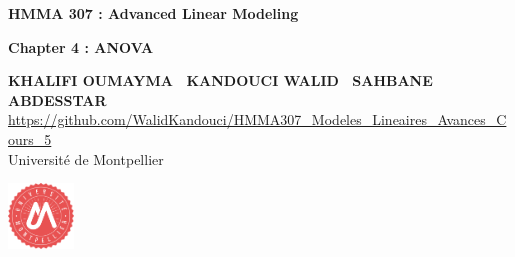 \documentclass[unknownkeysallowed]{beamer}
\begin{document}



\begin{frame}[noframenumbering]
\thispagestyle{empty}
\bigskip
\bigskip
\begin{center}{
\LARGE\color{marron}
\textbf{HMMA 307 : Advanced Linear Modeling}
\textbf{ }\\
\vspace{0.5cm}
}

\color{marron}
\textbf{Chapter 4 : ANOVA}
\end{center}

\vspace{0.5cm}

\begin{center}
\textbf{KHALIFI OUMAYMA \ KANDOUCI WALID \ SAHBANE ABDESSTAR } \\
\vspace{0.1cm}
\url{https://github.com/WalidKandouci/HMMA307_Modeles_Lineaires_Avances_Cours_5}\\
\vspace{0.5cm}
Université de Montpellier \\
\end{center}

\centering
\includegraphics[width=0.13\textwidth]{Logo.pdf}
\end{frame}
\end{document}

